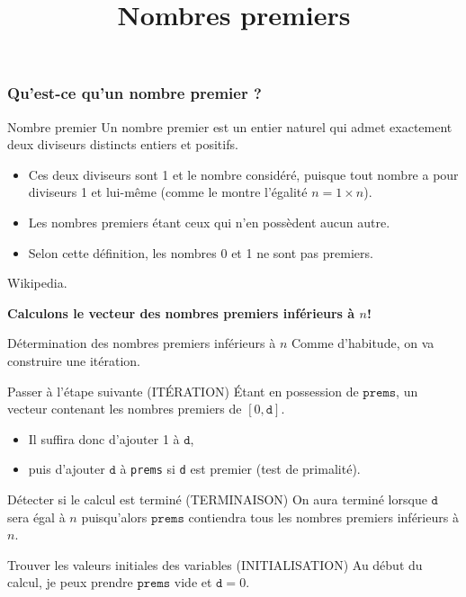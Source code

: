 \documentclass[10pt]{beamer}
\title{Nombres premiers}
\begin{document}
\maketitle



\begin{frame}[fragile]
  \frametitle{Qu'est-ce qu'un nombre premier ?}
  \begin{alertblock}{Nombre premier}
    \alert{Un nombre premier est un entier naturel qui admet exactement deux diviseurs distincts entiers et positifs.}\\
    \begin{itemize}
    \item Ces deux diviseurs sont 1 et le nombre considéré, puisque tout nombre a pour diviseurs 1 et lui-même (comme le montre l’égalité $ n=1\times n$).
    \item Les nombres premiers étant ceux qui n’en possèdent aucun autre.
    \item Selon cette définition, les nombres 0 et 1 ne sont pas premiers.
    \end{itemize}
    \begin{flushright}
      Wikipedia.
    \end{flushright}
  \end{alertblock}

  \begin{center}
    \textbf{\alert{Calculons le vecteur des nombres premiers inférieurs à $n$!}}
  \end{center}


\end{frame}



\begin{frame}{Détermination des nombres premiers inférieurs à $n$}
  Comme d'habitude, on va construire une itération.
  \begin{block}{Passer à l'étape suivante (\alert{ITÉRATION})}
    Étant en possession de $\mathtt{prems}$, un vecteur contenant les nombres premiers de $[0, \mathtt{d}]$.
    \begin{itemize}
    \item Il suffira donc d'ajouter 1 à $\mathtt{d}$,
    \item puis d'ajouter $\mathtt{d}$ à \texttt{prems} si \texttt{d} est premier (\alert{test de primalité}).
    \end{itemize}

  \end{block}
  \begin{block}{Détecter si le calcul est terminé (\alert{TERMINAISON})}
    On aura terminé lorsque $\mathtt{d}$ sera égal à $n$ puisqu'alors $\mathtt{prems}$ contiendra tous les nombres premiers inférieurs à $n$.
  \end{block}

  \begin{block}{Trouver les valeurs initiales des variables (\alert{INITIALISATION})}
    Au début du calcul, je peux prendre $\mathtt{prems}$ vide et $\mathtt{d} =0$. \\
  \end{block}
\end{frame}
\end{document}
